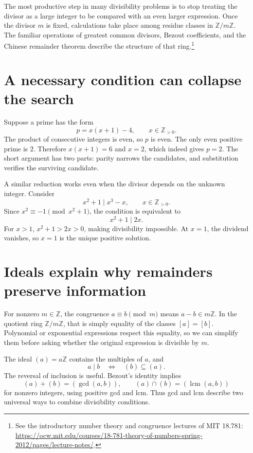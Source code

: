 
The most productive step in many divisibility problems is to stop treating the divisor as a large integer to be compared with an even larger expression. Once the divisor \(m\) is fixed, calculations take place among residue classes in \(\mathbb Z/m\mathbb Z\). The familiar operations of greatest common divisors, Bezout coefficients, and the Chinese remainder theorem describe the structure of that ring.\footnote{See the introductory number theory and congruence lectures of MIT 18.781: \url{https://ocw.mit.edu/courses/18-781-theory-of-numbers-spring-2012/pages/lecture-notes/}.}

\section{A necessary condition can collapse the search}

Suppose a prime has the form
\[
 p=x(x+1)-4,\qquad x\in\mathbb Z_{>0}.
\]
The product of consecutive integers is even, so \(p\) is even. The only even positive prime is \(2\). Therefore \(x(x+1)=6\) and \(x=2\), which indeed gives \(p=2\). The short argument has two parts: parity narrows the candidates, and substitution verifies the surviving candidate.

A similar reduction works even when the divisor depends on the unknown integer. Consider
\[
 x^2+1\mid x^3-x,\qquad x\in\mathbb Z_{>0}.
\]
Since \(x^2\equiv-1\pmod{x^2+1}\), the condition is equivalent to
\[
 x^2+1\mid2x.
\]
For \(x>1\), \(x^2+1>2x>0\), making divisibility impossible. At \(x=1\), the dividend vanishes, so \(x=1\) is the unique positive solution.

\section{Ideals explain why remainders preserve information}

For nonzero \(m\in\mathbb Z\), the congruence \(a\equiv b\pmod m\) means \(a-b\in m\mathbb Z\). In the quotient ring \(\mathbb Z/m\mathbb Z\), that is simply equality of the classes \([a]=[b]\). Polynomial or exponential expressions respect this equality, so we can simplify them before asking whether the original expression is divisible by \(m\).

The ideal \((a)=a\mathbb Z\) contains the multiples of \(a\), and
\[
 a\mid b\quad\Longleftrightarrow\quad (b)\subseteq(a).
\]
The reversal of inclusion is useful. Bezout's identity implies
\[
 (a)+(b)=(\gcd(a,b)),\qquad
 (a)\cap(b)=(\operatorname{lcm}(a,b))
\]
for nonzero integers, using positive gcd and lcm. Thus gcd and lcm describe two universal ways to combine divisibility conditions.


